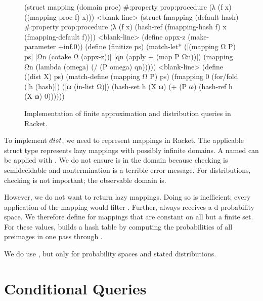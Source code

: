 \begin{figure}[tb]
\centering
\begin{schemedisplay}
(struct mapping (domain proc)
  #:property prop:procedure (λ (f x) ((mapping-proc f) x)))
<blank-line>
(struct fmapping (default hash)
  #:property prop:procedure
  (λ (f x) (hash-ref (fmapping-hash f) x (fmapping-default f))))
<blank-line>
(define appx-z (make-parameter +inf.0))
(define (finitize ps)
  (match-let* ([(mapping Ω P)  ps]
               [Ωn  (cotake Ω (appx-z))]
               [qn  (apply + (map P Ωn))])
    (mapping Ωn (lambda (omega) (/ (P omega) qn)))))
<blank-line>
(define ((dist X) ps)
  (match-define (mapping Ω P) ps)
  (fmapping 0 (for/fold ([h  (hash)]) ([ω  (in-list Ω)])
                (hash-set h (X ω) (+ (P ω) (hash-ref h (X ω) 0))))))
\end{schemedisplay}
\vspace{-\belowcodeskip}  %
\hrulefill
\caption[Implementation of finite approximation and distribution queries]{Implementation of finite approximation and distribution queries in Racket.}
\label{fig:dist-impl}
\end{figure}

To implement $dist$, we need to represent mappings in Racket. The applicable struct type  represents lazy mappings with possibly infinite domains. A  named  can be applied with . We do not ensure  is in the domain because checking is semidecidable and nontermination is a terrible error message. For distributions, checking is not important; the observable domain is.

However, we do not want  to return lazy mappings. Doing so is inefficient: every application of the mapping would filter . Further,  always receives a d probability space. We therefore define  for mappings that are constant on all but a finite set. For these values,  builds a hash table by computing the probabilities of all preimages in one pass through .

We do use , but only for probability spaces and stated distributions.


\section{Conditional Queries}

